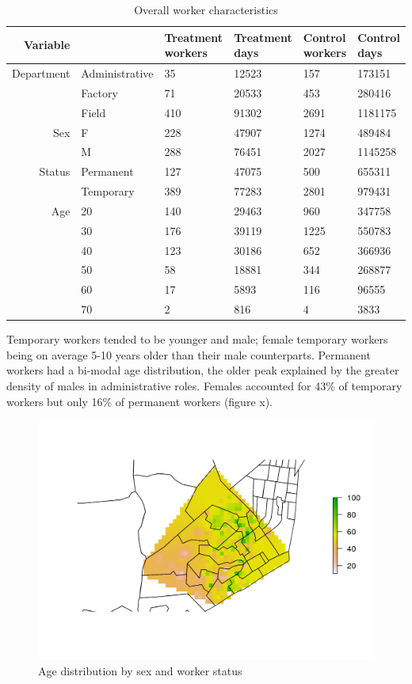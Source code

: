 \documentclass[]{article}
\begin{document}
\begin{table}[ht]
\centering
\begin{tabular}{rlllll}
  \hline
Variable &   & Treatment workers & Treatment days & Control workers & Control days \\ 
  \hline
Department & Administrative &  35 & 12523 & 157 & 173151 \\ 
   & Factory &  71 & 20533 & 453 & 280416 \\ 
   & Field & 410 & 91302 & 2691 & 1181175 \\ 
  Sex & F & 228 & 47907 & 1274 & 489484 \\ 
   & M & 288 & 76451 & 2027 & 1145258 \\ 
  Status & Permanent & 127 & 47075 & 500 & 655311 \\ 
   & Temporary & 389 & 77283 & 2801 & 979431 \\ 
  Age & 20 & 140 & 29463 & 960 & 347758 \\ 
   & 30 & 176 & 39119 & 1225 & 550783 \\ 
   & 40 & 123 & 30186 & 652 & 366936 \\ 
   & 50 &  58 & 18881 & 344 & 268877 \\ 
   & 60 &  17 & 5893 & 116 & 96555 \\ 
   & 70 &   2 & 816 &   4 & 3833 \\ 
   \hline
\end{tabular}
\caption{Overall worker characteristics} 
\end{table}

Temporary workers tended to be younger and male; female temporary
workers being on average 5-10 years older than their male counterparts.
Permanent workers had a bi-modal age distribution, the older peak
explained by the greater density of males in administrative roles.
Females accounted for 43\% of temporary workers but only 16\% of
permanent workers (figure x).

\begin{figure}[h]

{\centering \includegraphics{figures/unnamed-chunk-18-1} 

}

\caption{Age distribution by sex and worker status}\label{fig:unnamed-chunk-18}
\end{figure}
\end{document}
